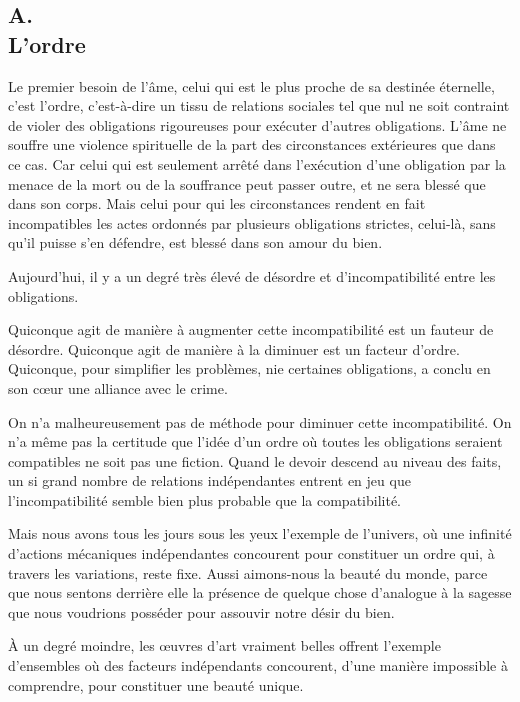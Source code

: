 \documentclass[french,twoside]{book} %
\begin{document}
\subsection[{A. L'ordre}]{A. \\
L'ordre}
\noindent \par
Le premier besoin de l'âme, celui qui est le plus proche de sa destinée éternelle, c'est l'ordre, c'est-à-dire un tissu de relations sociales tel que nul ne soit contraint de violer des obligations rigoureuses pour exécuter d'autres obligations. L'âme ne souffre une violence spirituelle de la part des circonstances extérieures que dans ce cas. Car celui qui est seulement arrêté dans l'exécution d'une obligation par la menace de la mort ou de la souffrance peut passer outre, et ne sera blessé que dans son corps. Mais celui pour qui les circonstances rendent en fait incompatibles les actes ordonnés par plusieurs obligations strictes, celui-là, sans qu'il puisse s'en défendre, est blessé dans son amour du bien.\par
Aujourd'hui, il y a un degré très élevé de désordre et d'incompatibilité entre les obligations.\par
Quiconque agit de manière à augmenter cette incompatibilité est un fauteur de désordre. Quiconque agit de manière à la diminuer est un facteur d'ordre. Quiconque, pour simplifier les problèmes, nie certaines obligations, a conclu en son cœur une alliance avec le crime.\par
On n'a malheureusement pas de méthode pour diminuer cette incompatibilité. On n'a même pas la certitude que l'idée d'un ordre où toutes les obligations seraient compatibles ne soit pas une fiction. Quand le devoir descend au niveau des faits, un si grand nombre de relations indépendantes entrent en jeu que l'incompatibilité semble bien plus probable que la compatibilité.\par
Mais nous avons tous les jours sous les yeux l'exemple de l'univers, où une infinité d'actions mécaniques indépendantes concourent pour constituer un ordre qui, à travers les variations, reste fixe. Aussi aimons-nous la beauté du monde, parce que nous sentons derrière elle la présence de quelque chose d'analogue à la sagesse que nous voudrions posséder pour assouvir notre désir du bien.\par
À un degré moindre, les œuvres d'art vraiment belles offrent l'exemple d'ensembles où des facteurs indépendants concourent, d'une manière impossible à comprendre, pour constituer une beauté unique.\par
\end{document}
